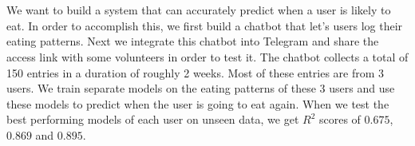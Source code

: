 \chapter{\abstractname}
We want to build a system that can accurately predict when a user is likely to eat. 
In order to accomplish this, we first build a chatbot that let's users log their eating patterns.
Next we integrate this chatbot into Telegram and share the access link with some volunteers in order to test it.
The chatbot collects a total of 150 entries in a duration of roughly 2 weeks.
Most of these entries are from 3 users.
We train separate models on the eating patterns of these 3 users
and use these models to predict when the user is going to eat again.
When we test the best performing models of each user on unseen data,
we get $R^2$ scores of $0.675$, $0.869$ and $0.895$.




